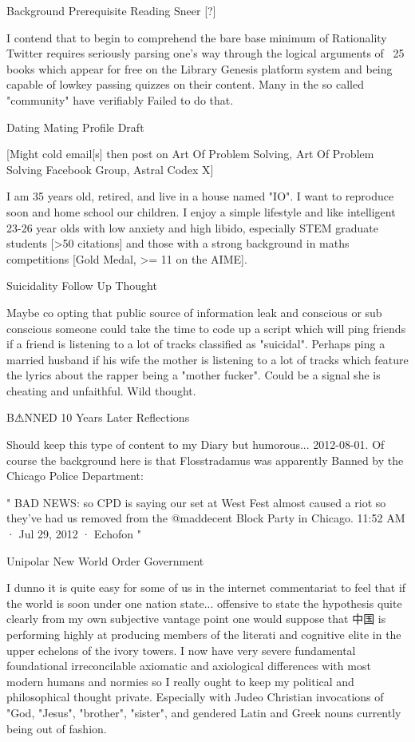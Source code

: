 	Background Prerequisite Reading Sneer [?]

I contend that to begin to comprehend the bare base minimum of Rationality Twitter requires seriously parsing one's way through the logical arguments of ~25 books which appear for free on the Library Genesis platform system and being capable of lowkey passing quizzes on their content. Many in the so called "community" have verifiably Failed to do that.

	Dating Mating Profile Draft

[Might cold email[s] then post on Art Of Problem Solving, Art Of Problem Solving Facebook Group, Astral Codex X]

I am 35 years old, retired, and live in a house named "IO". I want to reproduce soon and home school our children. I enjoy a simple lifestyle and like intelligent 23-26 year olds with low anxiety and high libido, especially STEM graduate students [>50 citations] and those with a strong background in maths competitions [Gold Medal, >= 11 on the AIME].

	Suicidality Follow Up Thought

Maybe co opting that public source of information leak and conscious or sub conscious someone could take the time to code up a script which will ping friends if a friend is listening to a lot of tracks classified as "suicidal". Perhaps ping a married husband if his wife the mother is listening to a lot of tracks which feature the lyrics about the rapper being a "mother fucker". Could be a signal she is cheating and unfaithful. Wild thought.

	B⚠NNED 10 Years Later Reflections

Should keep this type of content to my Diary but humorous... 2012-08-01. Of course the background here is that Flosstradamus was apparently Banned by the Chicago Police Department:

"
BAD NEWS: so CPD is saying our set at West Fest almost caused a riot so they've had us removed from the @maddecent Block Party in Chicago.
11:52 AM · Jul 29, 2012 · Echofon
"

	Unipolar New World Order Government

I dunno it is quite easy for some of us in the internet commentariat to feel that if the world is soon under one nation state... offensive to state the hypothesis quite clearly from my own subjective vantage point one would suppose that 中国 is performing highly at producing members of the literati and cognitive elite in the upper echelons of the ivory towers. I now have very severe fundamental foundational irreconcilable axiomatic and axiological differences with most modern humans and normies so I really ought to keep my political and philosophical thought private. Especially with Judeo Christian invocations of "God, "Jesus", "brother", "sister", and gendered Latin and Greek nouns currently being out of fashion.

